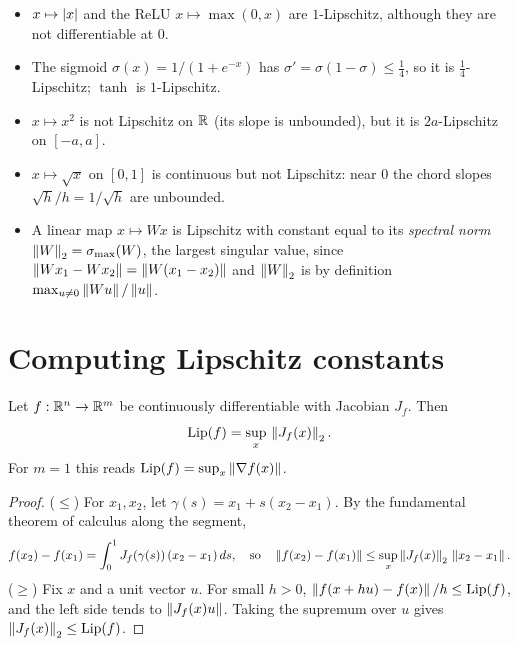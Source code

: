 \begin{notechapter}
\begin{example}\label{lipschitz-continuity:ex:examples}
\begin{itemize}[nosep]
  \item $x\mapsto\left|x\right|$ and the ReLU $x\mapsto\max(0,x)$ are $1$-Lipschitz,
        although they are not differentiable at $0$.
  \item The sigmoid $\sigma(x) = 1/(1+e^{-x})$ has $\sigma' = \sigma(1-\sigma)\leq\frac14$,
        so it is $\frac14$-Lipschitz; $\tanh$ is $1$-Lipschitz.
  \item $x\mapsto x^2$ is not Lipschitz on $\mathbb{R}$ (its slope is unbounded), but it
        is $2a$-Lipschitz on $[-a,a]$.
  \item $x\mapsto\sqrt x$ on $[0,1]$ is continuous but not Lipschitz: near $0$
        the chord slopes $\sqrt h/h = 1/\sqrt h$ are unbounded.
  \item A linear map $x\mapsto Wx$ is Lipschitz with constant equal to its
        \emph{spectral norm} $\left\|W\right\|_2 = \sigma_{\max}(W)$, the largest
        singular value, since $\left\|Wx_1 - Wx_2\right\| = \left\|W(x_1-x_2)\right\|$ and
        $\left\|W\right\|_2$ is by definition $\max_{u\neq0}\left\|Wu\right\|/\left\|u\right\|$.
\end{itemize}
\end{example}

\section{Computing Lipschitz constants}\label{lipschitz-continuity:sec:computing}

\begin{proposition}\label{lipschitz-continuity:prop:jacobian}
Let $f:\mathbb{R}^n\to\mathbb{R}^m$ be continuously differentiable with Jacobian $J_f$. Then
\[
  \mathrm{Lip}(f) = \sup_{x}\,\left\|J_f(x)\right\|_2 .
\]
For $m=1$ this reads $\mathrm{Lip}(f) = \sup_x\left\|\nabla f(x)\right\|$.
\end{proposition}

\begin{proof}
($\leq$) For $x_1,x_2$, let $\gamma(s) = x_1 + s(x_2-x_1)$. By the fundamental
theorem of calculus along the segment,
\[
  f(x_2) - f(x_1) = \int_0^1 J_f(\gamma(s))\,(x_2 - x_1)\,ds,
  \quad\text{so}\quad
  \left\|f(x_2)-f(x_1)\right\| \leq \sup_x\left\|J_f(x)\right\|_2\,\left\|x_2-x_1\right\|.
\]
($\geq$) Fix $x$ and a unit vector $u$. For small $h>0$,
$\left\|f(x + hu) - f(x)\right\|/h\leq\mathrm{Lip}(f)$, and the left side tends to
$\left\|J_f(x)u\right\|$. Taking the supremum over $u$ gives
$\left\|J_f(x)\right\|_2\leq\mathrm{Lip}(f)$.
\end{proof}


\end{notechapter}
